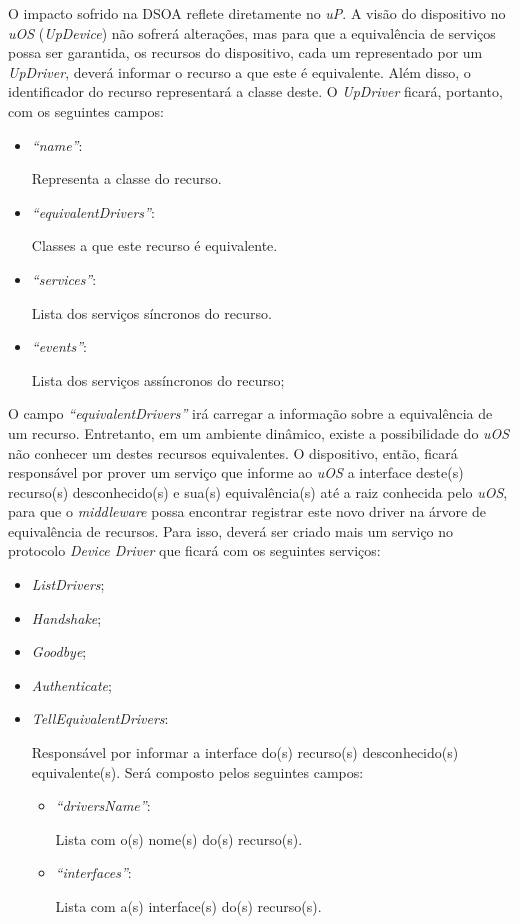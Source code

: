 O impacto sofrido na DSOA reflete diretamente no \emph{uP}. A visão do dispositivo no \emph{uOS} (\emph{UpDevice}) não sofrerá alterações, mas para que a equivalência de serviços possa ser garantida, os recursos do dispositivo, cada um representado por um \emph{UpDriver}, deverá informar o recurso a que este é equivalente. Além disso, o identificador do recurso representará a classe deste. O \emph{UpDriver} ficará, portanto, com os seguintes campos:

\begin{itemize}
	\item \emph{``name''}:
		
		Representa a classe do recurso.

	\item \emph{``equivalentDrivers''}:
	
		Classes a que este recurso é equivalente.
	\item \emph{``services''}:

		Lista dos serviços síncronos do recurso.

	\item \emph{``events''}:

		Lista dos serviços assíncronos do recurso;
\end{itemize}

O campo \emph{``equivalentDrivers''} irá carregar a informação sobre a equivalência de um recurso. Entretanto, em um ambiente dinâmico, existe a possibilidade do \emph{uOS} não conhecer um destes recursos equivalentes. O dispositivo, então, ficará responsável por prover um serviço que informe ao \emph{uOS} a interface deste(s) recurso(s) desconhecido(s) e sua(s) equivalência(s) até a raiz conhecida pelo \emph{uOS}, para que o \emph{middleware} possa encontrar registrar este novo driver na árvore de equivalência de recursos. Para isso, deverá ser criado mais um serviço no protocolo \emph{Device Driver} que ficará com os seguintes serviços:

\begin{itemize}
	\item \emph{ListDrivers};
	\item \emph{Handshake};
	\item \emph{Goodbye};
	\item \emph{Authenticate};
	\item \emph{TellEquivalentDrivers}:

		Responsável por informar a interface do(s) recurso(s) desconhecido(s) equivalente(s). Será composto pelos seguintes campos:

		\begin{itemize}
			\item \emph{``driversName''}:

			Lista com o(s) nome(s) do(s) recurso(s).

			\item \emph{``interfaces''}:

			Lista com a(s) interface(s) do(s) recurso(s).
		\end{itemize}
\end{itemize}

